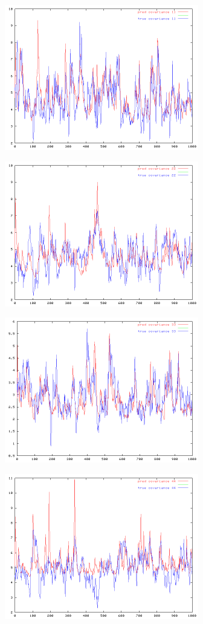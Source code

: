 {\includegraphics[height=2.5in, width=\textwidth]{covarplot11.png}

\includegraphics[height=2.5in, width=\textwidth]{covarplot22.png}

\includegraphics[height=2.5in, width=\textwidth]{covarplot33.png}


\includegraphics[height=2.5in, width=\textwidth]{covarplot44.png}

}
